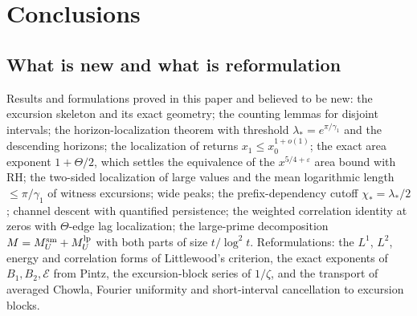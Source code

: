 \documentclass[11pt,reqno]{amsart}
\numberwithin{equation}{section}
\theoremstyle{plain}
\theoremstyle{definition}
\theoremstyle{remark}
\newcommand{\eps}{\varepsilon}
\newcommand{\En}{\mathcal{E}}
\begin{document}
\section{Conclusions}
\label{sec:conclusions}

\subsection*{What is new and what is reformulation}
Results and formulations proved in this paper and believed to be new: the excursion skeleton and its exact geometry; the counting lemmas for
disjoint intervals; the horizon-localization theorem with threshold
$\lambda_*=e^{\pi/\gamma_1}$ and the descending horizons; the localization
of returns $x_1\le x_0^{1+o(1)}$; the exact area exponent $1+\Theta/2$, which
settles the equivalence of the $x^{5/4+\eps}$ area bound with RH; the
two-sided localization of large values and the mean logarithmic length
$\le\pi/\gamma_1$ of witness excursions; wide peaks; the prefix-dependency
cutoff $\chi_*=\lambda_*/2$; channel descent with quantified persistence;
the weighted correlation identity at zeros with $\Theta$-edge lag
localization; the large-prime decomposition $M=M^{\rm sm}_U+M^{\rm lp}_U$
with both parts of size $t/\log^2t$. Reformulations: the $L^1$, $L^2$,
energy and correlation forms of Littlewood's criterion, the exact exponents
of $B_1,B_2,\En$ from Pintz, the excursion-block series of $1/\zeta$, and the
transport of averaged Chowla, Fourier uniformity and short-interval
cancellation to excursion blocks.
\end{document}
